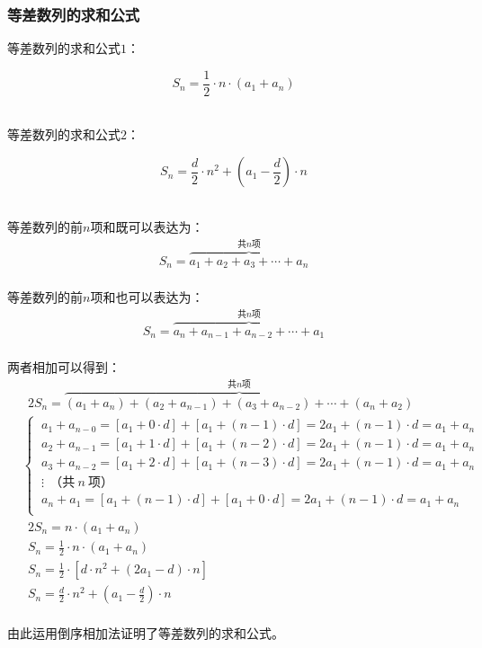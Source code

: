 \documentclass[UTF8]{ctexart}
\begin{document}
\newpage

\subsubsection{等差数列的求和公式}
    \setcounter{equation}{0}
    等差数列的求和公式$1$：
    \begin{large}
        \begin{equation*}
            S_n=\frac{1}{2}\cdot n\cdot(a_1+a_n)
        \end{equation*}
    \end{large}\\
    等差数列的求和公式$2$：
    \begin{large}
        \begin{equation*}
            S_n=\frac{d}{2}\cdot n^2+\left(a_1-\frac{d}{2}\right)\cdot n
        \end{equation*}
    \end{large}\\
    等差数列的前$n$项和既可以表达为：
    \begin{align}
        S_n=\overbrace{a_1+a_2+a_3+\cdots+a_n}^{\text{共}n\text{项}}
    \end{align}\\
    等差数列的前$n$项和也可以表达为：
    \begin{align}
        S_n=\overbrace{a_n+a_{n-1}+a_{n-2}+\cdots+a_1}^{\text{共}n\text{项}}
    \end{align}\\
    两者相加可以得到：
    \begin{align}
        &~~2S_n=\overbrace{(a_1+a_n)+(a_2+a_{n-1})+(a_3+a_{n-2})+\cdots+(a_n+a_2)}^{\text{共}n\text{项}}\\[3mm]
        &\begin{cases}
            ~a_1+a_{n-0}=[a_1+0\cdot d]+[a_1+(n-1)\cdot d]=2a_1+(n-1)\cdot d=a_1+a_n\\[1mm]
            ~a_2+a_{n-1}=[a_1+1\cdot d]+[a_1+(n-2)\cdot d]=2a_1+(n-1)\cdot d=a_1+a_n\\[1mm]
            ~a_3+a_{n-2}=[a_1+2\cdot d]+[a_1+(n-3)\cdot d]=2a_1+(n-1)\cdot d=a_1+a_n\\[1mm]
            ~\vdots~~\text{（共}~n~\text{项）}\\[1mm]
            ~a_n+a_{1}=[a_1+(n-1)\cdot d]+[a_1+0\cdot d]=2a_1+(n-1)\cdot d=a_1+a_n\\[1mm]
        \end{cases}\\[3mm]
        &~~2S_n=n\cdot (a_1+a_n)\\[3mm]
        &~~S_n=\frac{1}{2}\cdot n\cdot (a_1+a_n)\\[3mm]
        &~~S_n=\frac{1}{2}\cdot [d\cdot n^2+(2a_1-d)\cdot n]\\[3mm]
        &~~S_n=\frac{d}{2}\cdot n^2+\left(a_1-\frac{d}{2}\right)\cdot n
    \end{align}\\
    由此运用倒序相加法证明了等差数列的求和公式。
\end{document}

